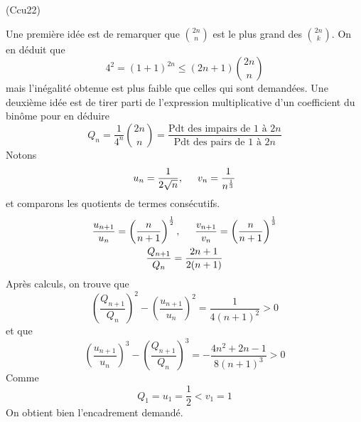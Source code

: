 \begin{tiny}(Ccu22)\end{tiny} Une première idée est de remarquer que $\binom{2n}{n}$ est le plus grand des $\binom{2n}{k}$. On en déduit que
\begin{displaymath}
  4^2 = (1+1)^{2n} \leq (2n+1)\binom{2n}{n}
\end{displaymath}
mais l'inégalité obtenue est plus faible que celles qui sont demandées.\newline
Une deuxième idée est de tirer parti de l'expression multiplicative d'un coefficient du binôme pour en déduire
\begin{displaymath}
  Q_n = \frac{1}{4^n}\binom{2n}{n} = \frac{\text{Pdt des impairs de $1$ à $2n$}}{\text{Pdt des pairs de $1$ à $2n$}}
\end{displaymath}
Notons 
\begin{displaymath}
  u_n = \frac{1}{2\sqrt{n}},\hspace{0.5cm} v_n =\frac{1}{n^{\frac{1}{3}}}
\end{displaymath}
et comparons les quotients de termes consécutifs.
\begin{multline*}
  \frac{u_{n+1}}{u_n} = \left( \frac{n}{n+1}\right)^{\frac{1}{2}} ,\hspace{0.5cm}
  \frac{v_{n+1}}{v_n} = \left( \frac{n}{n+1}\right)^{\frac{1}{3}}\\
  \frac{Q_{n+1}}{Q_n} = \frac{2n+1}{2(n+1)}
\end{multline*}
Après calculs, on trouve que
\begin{displaymath}
 \left( \frac{Q_{n+1}}{Q_n}\right)^{2} - \left(\frac{u_{n+1}}{u_n} \right)^2
 = \frac{1}{4(n+1)^2}>0
\end{displaymath}
et que
\begin{displaymath}
 \left(\frac{u_{n+1}}{u_n} \right)^3 - \left( \frac{Q_{n+1}}{Q_n}\right)^{3}
 = -\frac{4n^2+2n-1}{8(n+1)^3}>0
\end{displaymath}
Comme
\begin{displaymath}
  Q_1 = u_1 = \frac{1}{2} < v_1 = 1
\end{displaymath}
On obtient bien l'encadrement demandé.